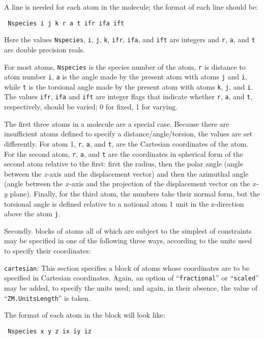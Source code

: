 \begin{description}
A line is needed for each atom in the molecule; the format of each
line should be:

\noindent\texttt{    Nspecies i j k r a t ifr ifa ift}

Here the values \texttt{Nspecies}, \texttt{i}, \texttt{j}, \texttt{k},
\texttt{ifr}, \texttt{ifa}, and \texttt{ift} are integers and
\texttt{r}, \texttt{a}, and \texttt{t} are double precision reals.

For most atoms, \texttt{Nspecies} is the species number of the atom,
\texttt{r} is distance to atom number \texttt{i}, \texttt{a} is the
angle made by the present atom with atoms \texttt{j} and \texttt{i},
while \texttt{t} is the torsional angle made by the present atom with
atoms \texttt{k}, \texttt{j}, and \texttt{i}. The values \texttt{ifr},
\texttt{ifa} and \texttt{ift} are integer flags that indicate whether
\texttt{r}, \texttt{a}, and \texttt{t}, respectively, should be
varied; 0 for fixed, 1 for varying.


The first three atoms in a molecule are a special case. Because there
are insufficient atoms defined to specify a distance/angle/torsion,
the values are set differently. For atom 1, \texttt{r}, \texttt{a},
and \texttt{t}, are the Cartesian coordinates of the atom.  For the
second atom, \texttt{r}, \texttt{a}, and \texttt{t} are the
coordinates in spherical form of the second atom relative to the
first: first the radius, then the polar angle (angle between the
$z$-axis and the displacement vector) and then the azimuthal angle
(angle between the $x$-axis and the projection of the displacement
vector on the $x$-$y$ plane). Finally, for the third atom, the numbers
take their normal form, but the torsional angle is defined relative to
a notional atom 1 unit in the z-direction above the atom \texttt{j}.

Secondly. blocks of atoms all of which are subject to the simplest of
constraints may be specified in one of the following three ways,
according to the units used to specify their coordinates:


\item \texttt{cartesian}: This section specifies a block of atoms
whose coordinates are to be specified in Cartesian coordinates. Again,
an option of ``\texttt{fractional}'' or ``\texttt{scaled}'' may be
added, to specify the units used; and again, in their absence, the
value of ``\texttt{ZM.UnitsLength}'' is taken.

The format of each atom in the block will look like:

\noindent\texttt{      Nspecies x y z ix iy iz}


\end{description}
